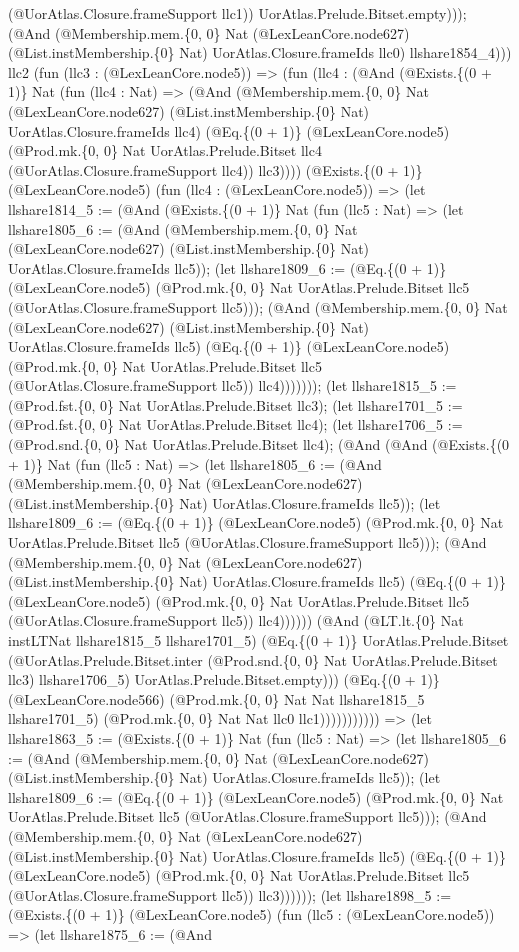 \documentclass[11pt]{article}
\begin{document}
(@UorAtlas.Closure.frameSupport llc1)) UorAtlas.Prelude.Bitset.empty))); (@And (@Membership.mem.\{0, 0\} Nat (@LexLeanCore.node627) (@List.instMembership.\{0\} Nat) UorAtlas.Closure.frameIds llc0) llshare1854\_4))) llc2 (fun (llc3 : (@LexLeanCore.node5)) => (fun (llc4 : (@And (@Exists.\{(0 + 1)\} Nat (fun (llc4 : Nat) => (@And (@Membership.mem.\{0, 0\} Nat (@LexLeanCore.node627) (@List.instMembership.\{0\} Nat) UorAtlas.Closure.frameIds llc4) (@Eq.\{(0 + 1)\} (@LexLeanCore.node5) (@Prod.mk.\{0, 0\} Nat UorAtlas.Prelude.Bitset llc4 (@UorAtlas.Closure.frameSupport llc4)) llc3)))) (@Exists.\{(0 + 1)\} (@LexLeanCore.node5) (fun (llc4 : (@LexLeanCore.node5)) => (let llshare1814\_5 := (@And (@Exists.\{(0 + 1)\} Nat (fun (llc5 : Nat) => (let llshare1805\_6 := (@And (@Membership.mem.\{0, 0\} Nat (@LexLeanCore.node627) (@List.instMembership.\{0\} Nat) UorAtlas.Closure.frameIds llc5)); (let llshare1809\_6 := (@Eq.\{(0 + 1)\} (@LexLeanCore.node5) (@Prod.mk.\{0, 0\} Nat UorAtlas.Prelude.Bitset llc5 (@UorAtlas.Closure.frameSupport llc5))); (@And (@Membership.mem.\{0, 0\} Nat (@LexLeanCore.node627) (@List.instMembership.\{0\} Nat) UorAtlas.Closure.frameIds llc5) (@Eq.\{(0 + 1)\} (@LexLeanCore.node5) (@Prod.mk.\{0, 0\} Nat UorAtlas.Prelude.Bitset llc5 (@UorAtlas.Closure.frameSupport llc5)) llc4))))))); (let llshare1815\_5 := (@Prod.fst.\{0, 0\} Nat UorAtlas.Prelude.Bitset llc3); (let llshare1701\_5 := (@Prod.fst.\{0, 0\} Nat UorAtlas.Prelude.Bitset llc4); (let llshare1706\_5 := (@Prod.snd.\{0, 0\} Nat UorAtlas.Prelude.Bitset llc4); (@And (@And (@Exists.\{(0 + 1)\} Nat (fun (llc5 : Nat) => (let llshare1805\_6 := (@And (@Membership.mem.\{0, 0\} Nat (@LexLeanCore.node627) (@List.instMembership.\{0\} Nat) UorAtlas.Closure.frameIds llc5)); (let llshare1809\_6 := (@Eq.\{(0 + 1)\} (@LexLeanCore.node5) (@Prod.mk.\{0, 0\} Nat UorAtlas.Prelude.Bitset llc5 (@UorAtlas.Closure.frameSupport llc5))); (@And (@Membership.mem.\{0, 0\} Nat (@LexLeanCore.node627) (@List.instMembership.\{0\} Nat) UorAtlas.Closure.frameIds llc5) (@Eq.\{(0 + 1)\} (@LexLeanCore.node5) (@Prod.mk.\{0, 0\} Nat UorAtlas.Prelude.Bitset llc5 (@UorAtlas.Closure.frameSupport llc5)) llc4)))))) (@And (@LT.lt.\{0\} Nat instLTNat llshare1815\_5 llshare1701\_5) (@Eq.\{(0 + 1)\} UorAtlas.Prelude.Bitset (@UorAtlas.Prelude.Bitset.inter (@Prod.snd.\{0, 0\} Nat UorAtlas.Prelude.Bitset llc3) llshare1706\_5) UorAtlas.Prelude.Bitset.empty))) (@Eq.\{(0 + 1)\} (@LexLeanCore.node566) (@Prod.mk.\{0, 0\} Nat Nat llshare1815\_5 llshare1701\_5) (@Prod.mk.\{0, 0\} Nat Nat llc0 llc1))))))))))) => (let llshare1863\_5 := (@Exists.\{(0 + 1)\} Nat (fun (llc5 : Nat) => (let llshare1805\_6 := (@And (@Membership.mem.\{0, 0\} Nat (@LexLeanCore.node627) (@List.instMembership.\{0\} Nat) UorAtlas.Closure.frameIds llc5)); (let llshare1809\_6 := (@Eq.\{(0 + 1)\} (@LexLeanCore.node5) (@Prod.mk.\{0, 0\} Nat UorAtlas.Prelude.Bitset llc5 (@UorAtlas.Closure.frameSupport llc5))); (@And (@Membership.mem.\{0, 0\} Nat (@LexLeanCore.node627) (@List.instMembership.\{0\} Nat) UorAtlas.Closure.frameIds llc5) (@Eq.\{(0 + 1)\} (@LexLeanCore.node5) (@Prod.mk.\{0, 0\} Nat UorAtlas.Prelude.Bitset llc5 (@UorAtlas.Closure.frameSupport llc5)) llc3)))))); (let llshare1898\_5 := (@Exists.\{(0 + 1)\} (@LexLeanCore.node5) (fun (llc5 : (@LexLeanCore.node5)) => (let llshare1875\_6 := (@And 
\end{document}
